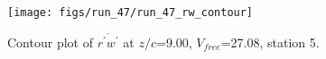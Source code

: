 \begin{figure}[H]
\centering
\texttt{[image: figs/run\_47/run\_47\_rw\_contour]}
\caption{Contour plot of $\overline{r^\prime w^\prime}$ at $z/c$=9.00, $V_{free}$=27.08, station 5.}
\label{fig:run_47_rw_contour}
\end{figure}


